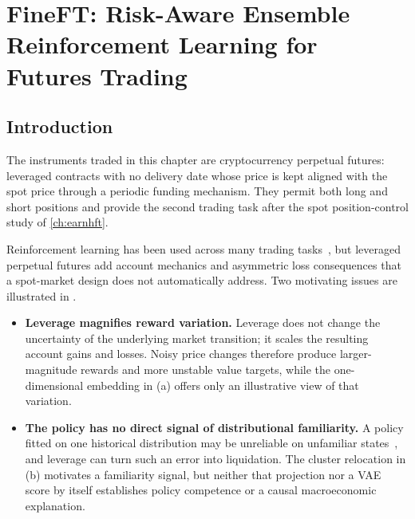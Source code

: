 
\chapter{FineFT: Risk-Aware Ensemble Reinforcement Learning for Futures Trading} %
\label{ch:fineft}

\section{Introduction}
\label{sec:fineft_intro}

The instruments traded in this chapter are cryptocurrency perpetual futures: leveraged contracts with no delivery date whose price is kept aligned with the spot price through a periodic funding mechanism. They permit both long and short positions and provide the second trading task after the spot position-control study of \cref{ch:earnhft}.

Reinforcement learning has been used across many trading tasks~\cite{qin2024earnhft,zong2024macrohft}, but leveraged perpetual futures add account mechanics and asymmetric loss consequences that a spot-market design does not automatically address. Two motivating issues are illustrated in .

\begin{itemize}
\item \textbf{Leverage magnifies reward variation.} Leverage does not change the uncertainty of the underlying market transition; it scales the resulting account gains and losses. Noisy price changes therefore produce larger-magnitude rewards and more unstable value targets, while the one-dimensional embedding in (a) offers only an illustrative view of that variation.
\item \textbf{The policy has no direct signal of distributional familiarity.} A policy fitted on one historical distribution may be unreliable on unfamiliar states~\cite{lan2022generalization}, and leverage can turn such an error into liquidation. The cluster relocation in (b) motivates a familiarity signal, but neither that projection nor a VAE score by itself establishes policy competence or a causal macroeconomic explanation.
\end{itemize}

